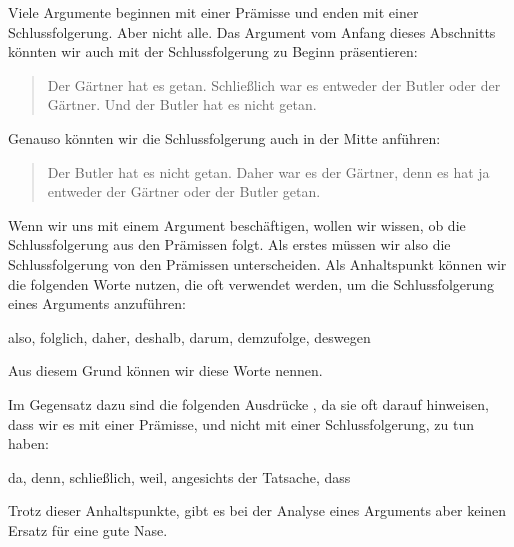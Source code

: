 Viele Argumente beginnen mit einer Prämisse und enden mit einer Schlussfolgerung. Aber nicht alle. Das Argument vom Anfang dieses Abschnitts könnten wir auch mit der Schlussfolgerung zu Beginn präsentieren:
	\begin{quote}
		Der Gärtner hat es getan. Schlie{\ss}lich war es entweder der Butler oder der Gärtner. Und der Butler hat es nicht getan. 
	\end{quote}
Genauso könnten wir die Schlussfolgerung auch in der Mitte anführen:
	\begin{quote}
		Der Butler hat es nicht getan. Daher war es der Gärtner, denn es hat ja entweder der Gärtner oder der Butler getan.
	\end{quote}
Wenn wir uns mit einem Argument beschäftigen, wollen wir wissen, ob die Schlussfolgerung aus den Prämissen folgt. Als erstes müssen wir also die Schlussfolgerung von den Prämissen unterscheiden. Als Anhaltspunkt können wir die folgenden Worte nutzen, die oft verwendet werden, um die Schlussfolgerung eines Arguments anzuführen:
	\begin{center}
		also, folglich, daher, deshalb, darum, demzufolge, deswegen
	\end{center}
Aus diesem Grund können wir diese Worte  nennen.

Im Gegensatz dazu sind die folgenden Ausdrücke , da sie oft darauf hinweisen, dass wir es mit einer Prämisse, und nicht mit einer Schlussfolgerung, zu tun haben:
	\begin{center}
		da, denn, schlie{\ss}lich, weil, angesichts der Tatsache, dass
	\end{center}
Trotz dieser Anhaltspunkte, gibt es bei der Analyse eines Arguments aber keinen Ersatz für eine gute Nase. 





